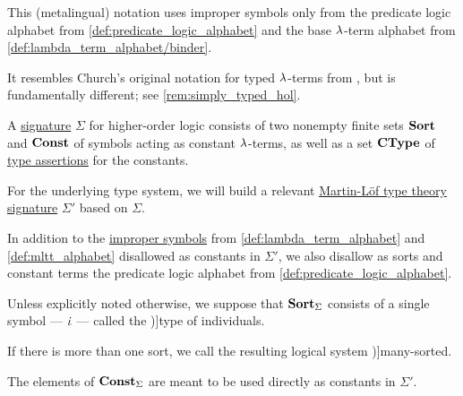 \begin{comments}
  \item This (metalingual) notation uses improper symbols only from the predicate logic alphabet from \cref{def:predicate_logic_alphabet} and the base \( {\mathrm \lambda} \)-term alphabet from \cref{def:lambda_term_alphabet/binder}.

  It resembles Church's original notation for typed \( {\mathrm \lambda} \)-terms from \cite{Church1940STT}, but is fundamentally different; see \cref{rem:simply_typed_hol}.
\end{comments}

\begin{definition}\label{def:hol_signature}\mimprovised
  A \hyperref[con:logical_system_signature]{signature} \( \Sigma \) for higher-order logic consists of two nonempty finite sets \( \op*{Sort} \) and \( \op*{Const} \) of symbols acting as constant \( {\mathrm \lambda} \)-terms, as well as a set \( \op*{CType} \) of \hyperref[def:type_assertion]{type assertions} for the constants.

  For the underlying type system, we will build a relevant \hyperref[def:mltt_signature]{Martin-L\"of type theory signature} \( \Sigma' \) based on \( \Sigma \).

  In addition to the \hyperref[con:improper_symbol]{improper symbols} from \cref{def:lambda_term_alphabet} and \cref{def:mltt_alphabet} disallowed as constants in \( \Sigma' \), we also disallow as sorts and constant terms the predicate logic alphabet from \cref{def:predicate_logic_alphabet}.

  \begin{thmenum}
     Unless explicitly noted otherwise, we suppose that \( \op*{Sort}_\Sigma \) consists of a single symbol --- \( \dot{\iota} \) --- called the \term[en=type of individuals (\cite[56]{Church1940STT})]{type of individuals}.

    If there is more than one sort, we call the resulting logical system \term[en=many-sorted predicate logic (\cite[\S 4.4.13]{TroelstraSchwichtenberg2000BasicProofTheory})]{many-sorted}.

     The elements of \( \op*{Const}_\Sigma \) are meant to be used directly as constants in \( \Sigma' \).


\end{thmenum}
\end{definition}
